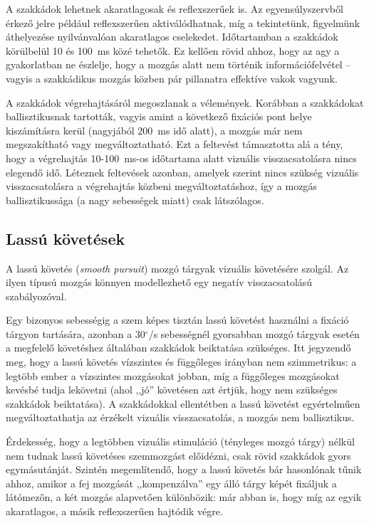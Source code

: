 A szakkádok lehetnek akaratlagosak és reflexszerűek is. Az egyensúlyszervből érkező jelre például reflexszerűen aktiválódhatnak, míg a tekintetünk, figyelmünk áthelyezése nyilvánvalóan akaratlagos cselekedet. Időtartamban a szakkádok körülbelül 10 és 100~ms közé tehetők. Ez kellően rövid ahhoz, hogy az agy a gyakorlatban ne észlelje, hogy a mozgás alatt nem történik információfelvétel -- vagyis a szakkádikus mozgás közben pár pillanatra effektíve vakok vagyunk. \cite{shebilske}

A szakkádok végrehajtásáról megoszlanak a vélemények. Korábban a szakkádokat ballisztikusnak tartották, vagyis amint a következő fixációs pont helye kiszámításra kerül (nagyjából 200~ms idő alatt), a mozgás már nem megszakítható vagy megváltoztatható. \cite{carpenter_book} Ezt a feltevést támasztotta alá a tény, hogy a végrehajtás 10-100~ms-os időtartama alatt vizuális visszacsatolásra nincs elegendő idő. Léteznek feltevések azonban, amelyek szerint nincs szükség vizuális visszacsatolásra a végrehajtás közbeni megváltoztatáshoz, így a mozgás ballisztikussága (a nagy sebességek miatt) csak látszólagos. \cite{zee}

\subsection{Lassú követések}\label{sect:lassukovetes}

A lassú követés (\emph{smooth pursuit}) mozgó tárgyak vizuális követésére szolgál. Az ilyen típusú mozgás könnyen modellezhető egy negatív visszacsatolású szabályozóval. \cite{carpenter_book}

Egy bizonyos sebességig a szem képes tisztán lassú követést használni a fixáció tárgyon tartására, azonban a 30$^{\circ}$/s sebességnél gyorsabban mozgó tárgyak esetén a megfelelő követéshez általában szakkádok beiktatása szükséges. Itt jegyzendő meg, hogy a lassú követés vízszintes és függőleges irányban nem szimmetrikus: a legtöbb ember a vízszintes mozgásokat jobban, míg a függőleges mozgásokat kevésbé tudja lekövetni (ahol ,,jó'' követésen azt értjük, hogy nem szükséges szakkádok beiktatása). A szakkádokkal ellentétben a lassú követést egyértelműen megváltoztathatja az érzékelt vizuális visszacsatolás, a mozgás nem ballisztikus.

Érdekesség, hogy a legtöbben vizuális stimuláció (tényleges mozgó tárgy) nélkül nem tudnak lassú követéses szemmozgást előidézni, csak rövid szakkádok gyors egymásutánját. Szintén megemlítendő, hogy a lassú követés bár hasonlónak tűnik ahhoz, amikor a fej mozgását ,,kompenzálva'' egy álló tárgy képét fixáljuk a látómezőn, a két mozgás alapvetően különbözik: már abban is, hogy míg az egyik akaratlagos, a másik reflexszerűen hajtódik végre.

